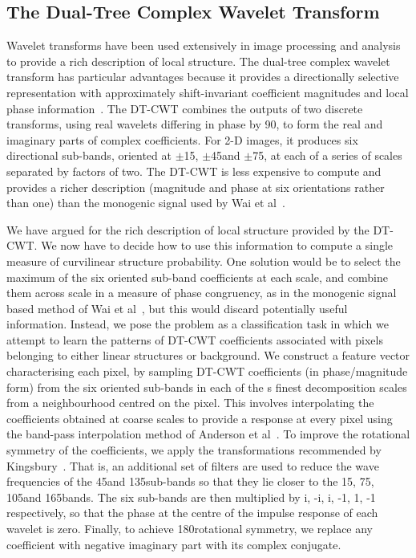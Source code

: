 \subsection{The Dual-Tree Complex Wavelet Transform}
Wavelet transforms have been used extensively in image processing and analysis to provide a rich description of local structure. The dual-tree complex wavelet transform has particular advantages because it provides a directionally selective representation with approximately shift-invariant coefficient magnitudes and local phase information~\cite{Kingsbury_ACHA01}. The DT-CWT combines the outputs of two discrete transforms, using real wavelets differing in phase by 90\deg, to form the real and imaginary parts of complex coefficients. For 2-D images, it produces six directional sub-bands, oriented at $\pm$15\deg, $\pm$45\deg and $\pm$75\deg, at each of a series of scales separated by factors of two. The DT-CWT is less expensive to compute and provides a richer description (magnitude and phase at six orientations rather than one) than the monogenic signal used by Wai et al~\cite{Wai_etal_MICCAI04}.


We have argued for the rich description of local structure provided by the DT-CWT. We now have to decide how to use this information to compute a single measure of curvilinear structure probability. One solution would be to select the maximum of the six oriented sub-band coefficients at each scale, and combine them across scale in a measure of phase congruency, as in the monogenic signal based method of Wai et al~\cite{Wai_etal_MICCAI04}, but this would discard potentially useful information. Instead, we pose the problem as a classification task in which we attempt to learn the patterns of DT-CWT coefficients associated with pixels belonging to either linear structures or background. We construct a feature vector characterising each pixel, by sampling DT-CWT coefficients (in phase/magnitude form) from the six oriented sub-bands in each of the s finest decomposition scales from a neighbourhood centred on the pixel. This involves interpolating the coefficients obtained at coarse scales to provide a response at every pixel using the band-pass interpolation method of Anderson et al~\cite{Anderson_etal_ICIP05}. To improve the rotational symmetry of the coefficients, we apply the transformations recommended by Kingsbury~\cite{Kingsbury_ECSP06}. That is, an additional set of filters are used to reduce the wave frequencies of the 45\deg and 135\deg sub-bands so that they lie closer to the 15\deg, 75\deg, 105\deg and 165\deg bands. The six sub-bands are then multiplied by {i, -i, i, -1, 1, -1} respectively, so that the phase at the centre of the impulse response of each wavelet is zero. Finally, to achieve 180\deg rotational symmetry, we replace any coefficient with negative imaginary part with its complex conjugate.


